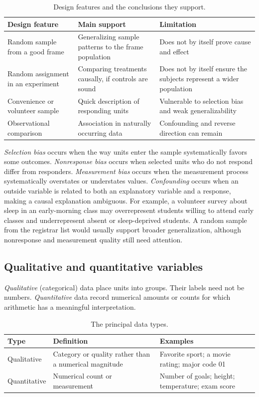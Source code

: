 \documentclass[11pt]{article}
\begin{document}
\begin{table}[ht]
\centering
\caption{Design features and the conclusions they support.}\label{tab:design}
\begin{tabularx}{\textwidth}{@{}lYY@{}}
\toprule
Design feature & Main support & Limitation \\
\midrule
Random sample from a good frame & Generalizing sample patterns to the frame population & Does not by itself prove cause and effect \\
Random assignment in an experiment & Comparing treatments causally, if controls are sound & Does not by itself ensure the subjects represent a wider population \\
Convenience or volunteer sample & Quick description of responding units & Vulnerable to selection bias and weak generalizability \\
Observational comparison & Association in naturally occurring data & Confounding and reverse direction can remain \\
\bottomrule
\end{tabularx}
\end{table}

\emph{Selection bias} occurs when the way units enter the sample systematically
favors some outcomes.  \emph{Nonresponse bias} occurs when selected units who
do not respond differ from responders.  \emph{Measurement bias} occurs when
the measurement process systematically overstates or understates values.
\emph{Confounding} occurs when an outside variable is related to both an
explanatory variable and a response, making a causal explanation ambiguous.
For example, a volunteer survey about sleep in an early-morning class may
overrepresent students willing to attend early classes and underrepresent
absent or sleep-deprived students.  A random sample from the registrar list
would usually support broader generalization, although nonresponse and
measurement quality still need attention.

\subsection{Qualitative and quantitative variables}
\emph{Qualitative} (categorical) data place units into groups.  Their labels
need not be numbers.  \emph{Quantitative} data record numerical amounts or
counts for which arithmetic has a meaningful interpretation.

\begin{table}[ht]
\centering
\caption{The principal data types.}\label{tab:data-types}
\begin{tabularx}{\textwidth}{@{}lYY@{}}
\toprule
Type & Definition & Examples \\
\midrule
Qualitative & Category or quality rather than a numerical magnitude &
Favorite sport; a movie rating; major code 01 \\
Quantitative & Numerical count or measurement &
Number of goals; height; temperature; exam score \\
\bottomrule
\end{tabularx}
\end{table}
\end{document}
